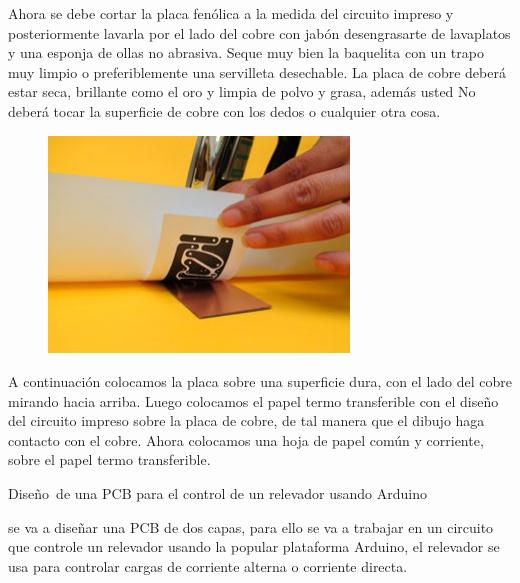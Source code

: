 \documentclass[12pt]{article}
\begin{document}
\par

Ahora se debe cortar la placa fenólica a la medida del circuito impreso y posteriormente lavarla por el lado del cobre con jabón desengrasarte de lavaplatos y una esponja de ollas no abrasiva. Seque muy bien la baquelita con un trapo muy limpio o preferiblemente una servilleta desechable. La placa de cobre deberá estar seca, brillante como el oro y limpia de polvo y grasa, además usted No deberá tocar la superficie de cobre con los dedos o cualquier otra cosa.\par




\begin{figure}[H]
	\begin{Center}
		\includegraphics[width=3.15in,height=2.27in]{./media/image12.jpeg}
	\end{Center}
\end{figure}



\par

A continuación colocamos la placa sobre una superficie dura, con el lado del cobre mirando hacia arriba. Luego colocamos el papel termo transferible con el diseño del circuito impreso sobre la placa de cobre, de tal manera que el dibujo haga contacto con el cobre. Ahora colocamos una hoja de papel común y corriente, sobre el papel termo transferible.\par

{\fontsize{14pt}{16.8pt}\selectfont Diseño\ de una PCB para el control de un relevador  usando Arduino\par}\par

{\fontsize{14pt}{16.8pt}\selectfont se va a diseñar una PCB de dos capas, para ello se va a trabajar en un circuito que controle un relevador usando la popular plataforma Arduino, el relevador se usa para controlar cargas de corriente alterna o corriente directa.\par}\par
\end{document}
